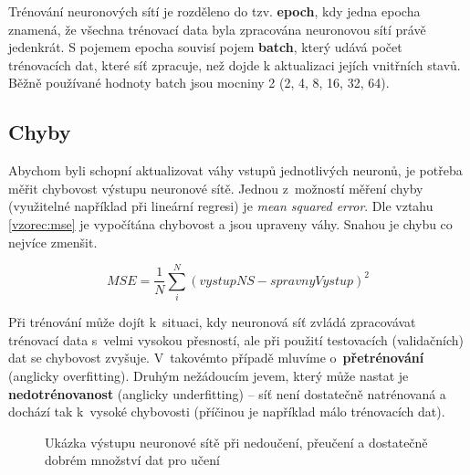 Trénování neuronových sítí je rozděleno do tzv. \textbf{epoch}, kdy jedna epocha znamená, že všechna trénovací data byla zpracována neuronovou sítí právě jedenkrát. S pojemem epocha souvisí pojem \textbf{batch}, který udává počet trénovacích dat, které síť zpracuje, než dojde k aktualizaci jejích vnitřních stavů. Běžně používané hodnoty batch jsou mocniny 2 (2, 4, 8, 16, 32, 64). 

\subsection*{Chyby}
Abychom byli schopní aktualizovat váhy vstupů jednotlivých neuronů, je potřeba měřit chybovost výstupu neuronové sítě. Jednou z~možností měření chyby (využitelné například při lineární regresi) je \emph{mean squared error}. Dle vztahu \ref{vzorec:mse} je vypočítána chybovost a jsou upraveny váhy. Snahou je chybu co nejvíce zmenšit.

\begin{equation}
  \label{vzorec:mse}
  MSE = \frac{1}{N} \sum_{i}^{N} (vystupNS - spravnyVystup)^2
\end{equation}

Při trénování může dojít k~situaci, kdy neuronová síť zvládá zpracovávat trénovací data s~velmi vysokou přesností, ale při použití testovacích (validačních) dat se chybovost zvyšuje. V~takovémto případě mluvíme o~\textbf{přetrénování} (anglicky overfitting). Druhým nežádoucím jevem, který může nastat je \textbf{nedotrénovanost} (anglicky underfitting) -- síť není dostatečně natrénovaná a dochází tak k~vysoké chybovosti (příčinou je například málo trénovacích dat).


\begin{figure}[H]
  \begin{center}
  \label{obrazek:fitting}
  \caption{Ukázka výstupu neuronové sítě při nedoučení, přeučení a dostatečně dobrém množství dat pro učení}
  \end{center}
\end{figure}



